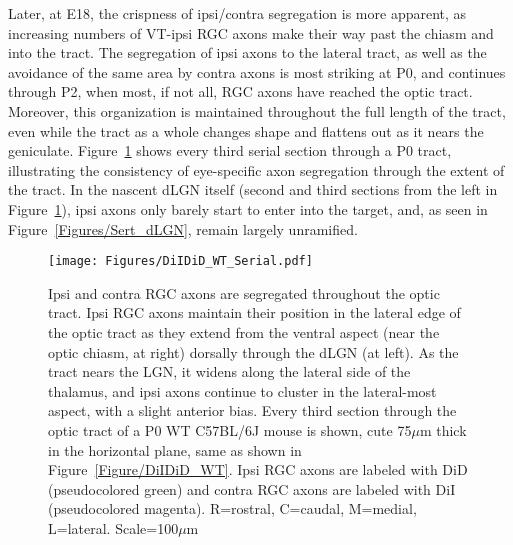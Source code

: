 Later, at E18, the crispness of ipsi/contra segregation is more apparent, as increasing numbers of VT-ipsi RGC axons make their way past the chiasm and into the tract.
The segregation of ipsi axons to the lateral tract, as well as the avoidance of the same area by contra axons is most striking at P0, and continues through P2, when most, if not all, RGC axons have reached the optic tract.
Moreover, this organization is maintained throughout the full length of the tract, even while the tract as a whole changes shape and flattens out as it nears the geniculate.
Figure~\ref{Figures/DiIDiD_WT_Serial} shows every third serial section through a P0 tract, illustrating the consistency of eye-specific axon segregation through the extent of the tract.
In the nascent dLGN itself (second and third sections from the left in Figure~\ref{Figures/DiIDiD_WT_Serial}), ipsi axons only barely start to enter into the target, and, as seen in Figure~\ref{Figures/Sert_dLGN}, remain largely unramified.

\begin{figure}[hbtp]
    \begin{center}
        \texttt{[image: Figures/DiIDiD\_WT\_Serial.pdf]}
        \caption[Ipsi and contra RGC axons are segregated throughout the optic tract.]
        {Ipsi and contra RGC axons are segregated throughout the optic tract.
        Ipsi RGC axons maintain their position in the lateral edge of the optic tract as they extend from the ventral aspect (near the optic chiasm, at right) dorsally through the dLGN (at left).
        As the tract nears the LGN, it widens along the lateral side of the thalamus, and ipsi axons continue to cluster in the lateral-most aspect, with a slight anterior bias.
        Every third section through the optic tract of a P0 WT C57BL/6J mouse is shown, cute 75$\mu$m thick in the horizontal plane, same as shown in Figure~\ref{Figure/DiIDiD_WT}.
        Ipsi RGC axons are labeled with DiD (pseudocolored green) and contra RGC axons are labeled with DiI (pseudocolored magenta).
        R=rostral, C=caudal, M=medial, L=lateral. Scale=100$\mu$m}
        \label{Figures/DiIDiD_WT_Serial}
    \end{center}
\end{figure}

